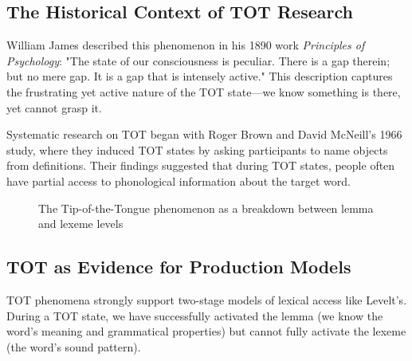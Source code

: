 \documentclass[12pt,a4paper]{article}
\begin{document}
\subsection{The Historical Context of TOT Research}

William James described this phenomenon in his 1890 work \textit{Principles of Psychology}: "The state of our consciousness is peculiar. There is a gap therein; but no mere gap. It is a gap that is intensely active." This description captures the frustrating yet active nature of the TOT state—we know something is there, yet cannot grasp it.

Systematic research on TOT began with Roger Brown and David McNeill's 1966 study, where they induced TOT states by asking participants to name objects from definitions. Their findings suggested that during TOT states, people often have partial access to phonological information about the target word.

\begin{figure}[h]
\centering
{}
\caption{The Tip-of-the-Tongue phenomenon as a breakdown between lemma and lexeme levels}
\label{fig:tot_phenomenon}
\end{figure}

\subsection{TOT as Evidence for Production Models}

TOT phenomena strongly support two-stage models of lexical access like Levelt's. During a TOT state, we have successfully activated the lemma (we know the word's meaning and grammatical properties) but cannot fully activate the lexeme (the word's sound pattern).
\end{document}
